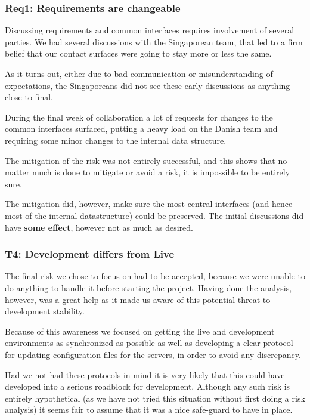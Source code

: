 \subsubsection{Req1: Requirements are changeable}

Discussing requirements and common interfaces requires involvement of several
parties. We had several discussions with the Singaporean team, that led to a
firm belief that our contact surfaces were going to stay more or less the same.

As it turns out, either due to bad communication or misunderstanding of
expectations, the Singaporeans did not see these early discussions as anything
close to final.

During the final week of collaboration a lot of requests for changes to the
common interfaces surfaced, putting a heavy load on the Danish team and
requiring some minor changes to the internal data structure.

The mitigation of the risk was not entirely successful, and this shows that no
matter much is done to mitigate or avoid a risk, it is impossible to be
entirely sure.

The mitigation did, however, make sure the most central interfaces (and hence
most of the internal datastructure) could be preserved. The initial discussions
did have \textbf{some effect}, however not as much as desired.

\subsubsection{T4: Development differs from Live}

The final risk we chose to focus on had to be accepted, because we were unable to do
anything to handle it before starting the project. Having done the analysis, however, was a great help
as it made us aware of this potential threat to development stability.

Because of this awareness we focused on getting the live and development environments as synchronized as
possible as well as developing a clear protocol for updating configuration files for the servers, in
order to avoid any discrepancy.

Had we not had these protocols in mind it is very likely that this could have developed into a serious
roadblock for development. Although any such risk is entirely hypothetical (as we have not tried this
situation without first doing a risk analysis) it seems fair to assume that it was a nice safe-guard to
have in place.

